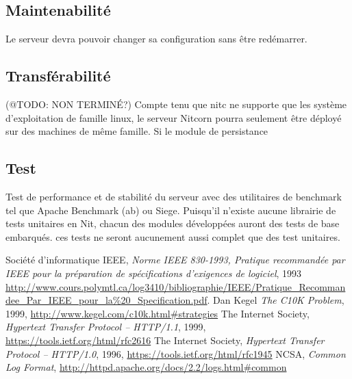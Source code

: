\documentclass{scrreprt}
\begin{document}
\subsection{Maintenabilité}
Le serveur devra pouvoir changer sa configuration sans être redémarrer.
\subsection{Transférabilité} 
(@TODO: NON TERMINÉ?)
Compte tenu que nitc ne supporte que les système d'exploitation de famille linux, le serveur Nitcorn pourra seulement être déployé
sur des machines de même famille. Si le module de persistance 

\subsection{Test}
Test de performance et de stabilité du serveur avec des utilitaires de benchmark tel que Apache Benchmark (ab) ou Siege. Puisqu'il n'existe aucune librairie de tests unitaires en Nit, chacun des modules développées auront des tests de base embarqués. ces tests ne seront aucunement aussi complet que des test unitaires.
\begin{thebibliography}{9}
  Société d'informatique IEEE,
\emph{Norme IEEE 830-1993, Pratique recommandée par IEEE pour la préparation de
spécifications d’exigences de logiciel}, 1993
\url{http://www.cours.polymtl.ca/log3410/bibliographie/IEEE/Pratique_Recommandee_Par_IEEE_pour_la\%20_Specification.pdf}.
  Dan Kegel
\emph{The C10K Problem}, 1999, \url{http://www.kegel.com/c10k.html#strategies}
    The Internet Society,
\emph{Hypertext Transfer Protocol -- HTTP/1.1}, 1999,
\url{https://tools.ietf.org/html/rfc2616}
    The Internet Society,
\emph{Hypertext Transfer Protocol -- HTTP/1.0}, 1996,
\url{https://tools.ietf.org/html/rfc1945}
	NCSA,
\emph{Common Log Format},
\url{http://httpd.apache.org/docs/2.2/logs.html#common}	
\end{thebibliography}

\end{document}
